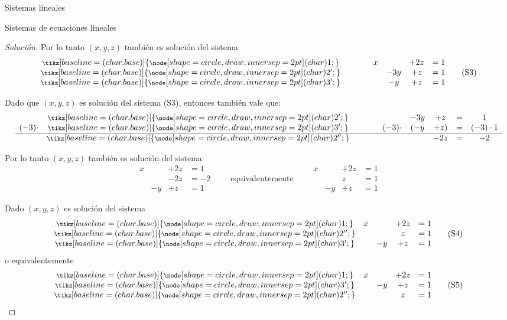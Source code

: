 \documentclass[a4paper,12pt,twoside,spanish,reqno]{amsbook}
\theoremstyle{definition}
\theoremstyle{remark}
\newcommand \circled[1]{\tikz[baseline=(char.base)]{
		\node[shape=circle,draw,inner sep=2pt] (char) {#1};}}
\begin{document}
\begin{chapter}{Sistemas lineales}
\begin{section}{Sistemas de ecuaciones lineales}
\begin{proof}[Solución]
Por lo tanto $(x,y,z)$ también es solución del sistema
\begin{equation*}
\begin{matrix}
{\footnotesize{\footnotesize\circled{1}}}&\qquad&x &  & +2z & = 1 \\
{\footnotesize{\footnotesize\circled{2'}}}&\qquad&& -3y & +z & = 1   \\
{\footnotesize{\footnotesize\circled{3'}}}&\qquad&& -y & +z & =1
\end{matrix}\tag{S3}
\end{equation*}
 

 
Dado que $(x,y,z)$ es solución del sistema (S3), entonces también vale que: 
\begin{equation*}
\begin{matrix}
&{\footnotesize{\footnotesize\circled{2'}}}&\qquad&& -3y & +z & = & 1 \\
(-3)\cdot&{\footnotesize{\footnotesize\circled{3'}}}&\qquad&(-3)\cdot&( -y & +z) & = &(-3)\cdot1 \\
\hline
&{\footnotesize{\footnotesize\circled{2''}}}&\qquad&&   & -2z & = & -2  
\end{matrix}
\end{equation*}

 
Por lo tanto $(x,y,z)$ también es solución del sistema
\begin{equation*}
\begin{matrix}
x &  & +2z & = 1 \\
&    & -2z & = -2\\
& -y & +z & =1 
\end{matrix}
\qquad\mbox{equivalentemente}\qquad
\begin{matrix}
x &  & +2z & = 1 \\
&    & z & = 1\\
& -y & +z & =1 
\end{matrix}
\end{equation*}
 

 
Dado $(x,y,z)$ es solución del sistema
\begin{equation*}
\begin{matrix}
{\footnotesize{\footnotesize\circled{1}}}&x &  & +2z & = 1 \\
{\footnotesize{\footnotesize\circled{2''}}}&&    & z & = 1 \\
{\footnotesize{\footnotesize\circled{3'}}}&& -y & +z & =1
\end{matrix}\tag{S4}
\end{equation*}
o equivalentemente 
\begin{equation*}
\begin{matrix}
{\footnotesize{\footnotesize\circled{1}}}&x &  & +2z & = 1 \\
{\footnotesize{\footnotesize\circled{3'}}}&& -y & +z & =1\\
{\footnotesize{\footnotesize\circled{2''}}}&&    & z & = 1 
\end{matrix}\tag{S5}
\end{equation*}


\end{proof}
\end{section}
\end{chapter}
\end{document}
